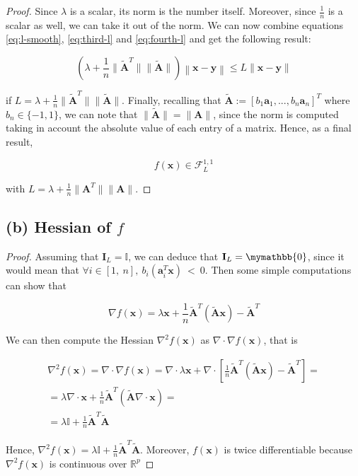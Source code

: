 \documentclass[12pt]{article}
\newcommand{\xb}{\mathbf{x}}
\newcommand{\yb}{\mathbf{y}}
\newcommand{\ab}{\mathbf{a}}
\newcommand{\abi}{\ab_i}
\newcommand{\atilde}{\mathbf{\tilde{A}}}
\newcommand{\id}{\mathbf{I}}
\newcommand{\fracn}{\frac{1}{n}}
\begin{document}
\begin{proof}
Since $\lambda$ is a scalar, its norm is the number itself. Moreover, since $\fracn$ is a scalar as well, we can take it out of the norm. We can now combine equations \eqref{eq:l-smooth}, \eqref{eq:third-l} and \eqref{eq:fourth-l} and get the following result:

\begin{equation}
    \left ( \lambda + \fracn \lVert \atilde^T \rVert \lVert \atilde \rVert \right ) \left \lVert \xb - \yb \right \rVert \leq L \lVert \xb - \yb \rVert
\end{equation}

if $L = \lambda + \fracn \lVert \atilde^T \rVert \lVert \atilde \rVert$. Finally, recalling that $\atilde:=[b_1\ab_1, ..., b_n\ab_n]^T$ where $b_n \in \{-1, 1\}$, we can note that $\lVert \atilde \rVert = \lVert \mathbf{A} \rVert$, since the norm is computed taking in account the absolute value of each entry of a matrix. Hence, as a final result,

\begin{equation}
    f(\xb) \in \mathcal{F}_{L}^{1, 1}
\end{equation}

with $L = \lambda + \fracn \lVert \mathbf{A}^T \rVert \lVert \mathbf{A} \rVert$.


\end{proof}

\subsection*{(b) Hessian of $f$}
\begin{proof}
Assuming that $\id_L = \mathbb{I}$, we can deduce that $\id_L = \mymathbb{0}$, since it would mean that $\forall i \in [1,\ n], \ b_i(\abi^T\xb) \ < \ 0$. Then some simple computations can show that

\begin{equation}
    \nabla f(\xb) = \lambda \xb + \fracn \atilde^T(\atilde\xb) - \atilde^T
\end{equation}

We can then compute the Hessian $\nabla^2 f(\xb)$ as $\nabla \cdot \nabla f(\xb)$, that is

\begin{gather}
    \nabla^2 f(\xb) = \nabla \cdot \nabla f(\xb) = \nabla \cdot \lambda \xb + \nabla \cdot \left [ \fracn \atilde^T(\atilde\xb) - \atilde^T \right ] \nonumber = \\
    = \lambda \nabla \cdot \xb + \fracn \atilde^T (\atilde \nabla \cdot \xb) = \nonumber \\
    = \lambda \mathbb{I} + \fracn \atilde^T \atilde
\end{gather}

Hence, $\nabla^2 f(\xb) = \lambda \mathbb{I} + \fracn \atilde^T \atilde$. Moreover, $f(\xb)$ is twice differentiable because $\nabla ^2 f(\xb)$ is continuous over $\mathbb{R}^p$

\end{proof}
\end{document}

